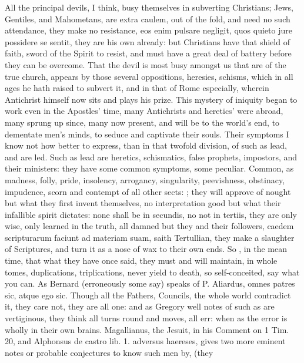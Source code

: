 {All the principal devils, I think, busy themselves in subverting
Christians; Jews, Gentiles, and Mahometans, are extra caulem, out of
the fold, and need no such attendance, they make no resistance,
eos enim pulsare negligit, quos quieto jure possidere se sentit,
they are his own already: but Christians have that shield of faith,
sword of the Spirit to resist, and must have a great deal of battery
before they can be overcome. That the devil is most busy amongst us
that are of the true church, appears by those several oppositions,
heresies, schisms, which in all ages he hath raised to subvert it, and
in that of Rome especially, wherein Antichrist himself now sits and
plays his prize. This mystery of iniquity began to work even in the
Apostles' time, many Antichrists and heretics' were abroad, many sprung
up since, many now present, and will be to the world's end, to
dementate men's minds, to seduce and captivate their souls. Their
symptoms I know not how better to express, than in that twofold
division, of such as lead, and are led. Such as lead are heretics,
schismatics, false prophets, impostors, and their ministers: they have
some common symptoms, some peculiar. Common, as madness, folly, pride,
insolency, arrogancy, singularity, peevishness, obstinacy, impudence,
scorn and contempt of all other sects: ; they will approve of nought but what they first invent
themselves, no interpretation good but what their infallible spirit
dictates: none shall be in secundis, no not in tertiis, they are only
wise, only learned in the truth, all damned but they and their
followers, caedem scripturarum faciunt ad materiam suam, saith
Tertullian, they make a slaughter of Scriptures, and turn it as a nose
of wax to their own ends. So , in the mean time, that what
they have once said, they must and will maintain, in whole tomes,
duplications, triplications, never yield to death, so self-conceited,
say what you can. As Bernard (erroneously some say) speaks of P.
Aliardus, omnes patres sic, atque ego sic. Though all the Fathers,
Councils, the whole world contradict it, they care not, they are all
one: and as  Gregory well notes of such as are vertiginous, they
think all turns round and moves, all err: when as the error is wholly
in their own brains. Magallianus, the Jesuit, in his Comment on 1 Tim.
 20, and Alphonsus de castro lib. 1. adversus haereses, gives two
more eminent notes or probable conjectures to know such men by, (they
}
